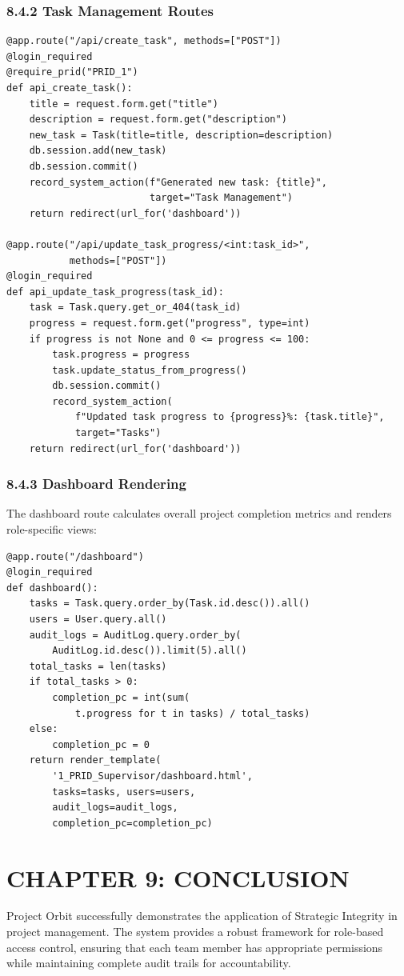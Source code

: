 ﻿\documentclass[12pt]{article}
\def\normaltext{\fontsize{12pt}{18pt}\color{secondary}}
\begin{document}
\subsubsection*{8.4.2 Task Management Routes}
\begin{lstlisting}[style=pycode]
@app.route("/api/create_task", methods=["POST"])
@login_required
@require_prid("PRID_1")
def api_create_task():
    title = request.form.get("title")
    description = request.form.get("description")
    new_task = Task(title=title, description=description)
    db.session.add(new_task)
    db.session.commit()
    record_system_action(f"Generated new task: {title}",
                         target="Task Management")
    return redirect(url_for('dashboard'))

@app.route("/api/update_task_progress/<int:task_id>",
           methods=["POST"])
@login_required
def api_update_task_progress(task_id):
    task = Task.query.get_or_404(task_id)
    progress = request.form.get("progress", type=int)
    if progress is not None and 0 <= progress <= 100:
        task.progress = progress
        task.update_status_from_progress()
        db.session.commit()
        record_system_action(
            f"Updated task progress to {progress}%: {task.title}",
            target="Tasks")
    return redirect(url_for('dashboard'))
\end{lstlisting}

\subsubsection*{8.4.3 Dashboard Rendering}
The dashboard route calculates overall project completion metrics and renders role-specific views:
\begin{lstlisting}[style=pycode]
@app.route("/dashboard")
@login_required
def dashboard():
    tasks = Task.query.order_by(Task.id.desc()).all()
    users = User.query.all()
    audit_logs = AuditLog.query.order_by(
        AuditLog.id.desc()).limit(5).all()
    total_tasks = len(tasks)
    if total_tasks > 0:
        completion_pc = int(sum(
            t.progress for t in tasks) / total_tasks)
    else:
        completion_pc = 0
    return render_template(
        '1_PRID_Supervisor/dashboard.html',
        tasks=tasks, users=users,
        audit_logs=audit_logs,
        completion_pc=completion_pc)
\end{lstlisting}
\newpage

\section*{{\color{primary}CHAPTER 9: CONCLUSION}}
\normaltext
Project Orbit successfully demonstrates the application of Strategic Integrity in project management. The system provides a robust framework for role-based access control, ensuring that each team member has appropriate permissions while maintaining complete audit trails for accountability.
\end{document}
